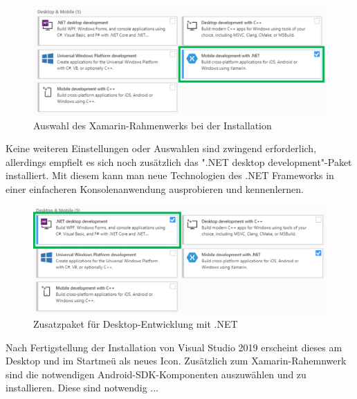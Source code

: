 


\begin{figure}[H]
    \centering\includegraphics[width=0.7\linewidth]{images/auswahl_rahmenwerk/installation.png}    
    \caption{Auswahl des Xamarin-Rahmenwerks bei der Installation}
\end{figure}
Keine weiteren Einstellungen oder Auswahlen sind zwingend erforderlich, allerdings empfielt es sich noch zusätzlich das ".NET desktop development"-Paket installiert. Mit diesem kann man neue Technologien des .NET Frameworks in einer einfacheren Konsolenanwendung ausprobieren und kennenlernen.
\begin{figure}[H]
    \centering\includegraphics[width=0.7\linewidth]{images/auswahl_rahmenwerk/installation2.png}    
    \caption{Zusatzpaket für Desktop-Entwicklung mit .NET}
\end{figure}
Nach Fertigstellung der Installation von Visual Studio 2019 erscheint dieses am Desktop und im Startmeü als neues Icon. Zusätzlich zum Xamarin-Rahemnwerk sind die notwendigen Android-SDK-Komponenten auszuwählen und zu installieren. Diese sind notwendig ...

